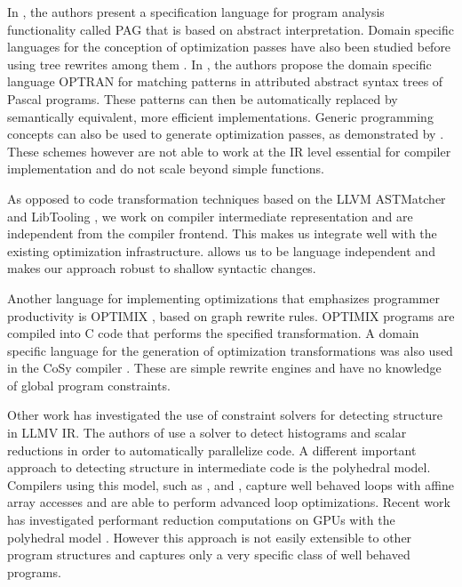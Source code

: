 In \cite{Martin1998}, the authors present a specification language for
program analysis functionality called PAG that is based on abstract interpretation.
Domain specific languages for the conception of optimization passes
have also been studied before using tree rewrites among them
\cite{Olmos:2005:CSD:2136624.2136643}.  In \cite{Lipps1989}, the
authors propose the domain specific language OPTRAN for matching
patterns in attributed abstract syntax trees of Pascal programs.
These patterns can then be automatically replaced by semantically
equivalent, more efficient implementations. 
Generic programming
concepts can also be used to generate optimization passes, as
demonstrated by \cite{Willcock:2009:RGP:1621607.1621611}.  These
schemes however are not able to work at the IR level essential for
compiler implementation and do not scale beyond simple functions.

As opposed to code transformation techniques based on the LLVM ASTMatcher and LibTooling \cite{be0fa11ddb194bde86a9dab8589b779c}, we work on compiler intermediate representation and are independent from the compiler frontend.
This makes us integrate well with the existing optimization infrastructure. allows us to be language independent and makes our approach robust to shallow syntactic changes.

Another language for implementing optimizations that emphasizes
programmer productivity is OPTIMIX \cite{Assmann1996,Assmann98optimix},
based on graph rewrite rules.  OPTIMIX programs are compiled into C
code that performs the specified transformation.  A domain specific
language for the generation of optimization transformations was also
used in the CoSy compiler \cite{Alt1994}. These are simple rewrite
engines and have no knowledge of global program constraints.

Other work has investigated the use of constraint solvers for
detecting structure in LLMV IR.  The authors of
\cite{ginsbach2017discovery} use a solver to detect histograms and
scalar reductions in order to automatically parallelize code.  A
different important approach to detecting structure in intermediate
code is the polyhedral model.  Compilers using this model, such as
\cite{Lengauer2012Polly}, \cite{Baskaran:2010:ACC:2175462.2175482} and
\cite{Verdoolaege:2013:PPC:2400682.2400713}, capture well behaved
loops with affine array accesses and are able to perform advanced loop
optimizations.
Recent work has investigated performant reduction computations on GPUs with the polyhedral model \cite{Reddy2016Reduction}.
However this approach is not easily extensible to other program
structures and captures only a very specific class of well behaved
programs.

